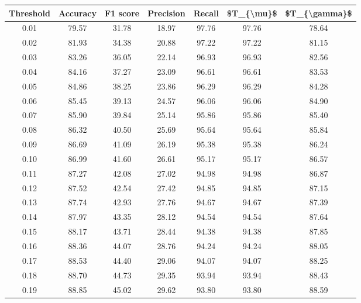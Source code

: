 \begin{tabular}{|c|c|c|c|c|c|c|}
\hline
 Threshold &  Accuracy &  F1 score &  Precision &  Recall &  \$T\_\{\textbackslash mu\}\$ &  \$T\_\{\textbackslash gamma\}\$ \\
\hline
      0.01 &     79.57 &     31.78 &      18.97 &   97.76 &      97.76 &         78.64 \\
      0.02 &     81.93 &     34.38 &      20.88 &   97.22 &      97.22 &         81.15 \\
      0.03 &     83.26 &     36.05 &      22.14 &   96.93 &      96.93 &         82.56 \\
      0.04 &     84.16 &     37.27 &      23.09 &   96.61 &      96.61 &         83.53 \\
      0.05 &     84.86 &     38.25 &      23.86 &   96.29 &      96.29 &         84.28 \\
      0.06 &     85.45 &     39.13 &      24.57 &   96.06 &      96.06 &         84.90 \\
      0.07 &     85.90 &     39.84 &      25.14 &   95.86 &      95.86 &         85.40 \\
      0.08 &     86.32 &     40.50 &      25.69 &   95.64 &      95.64 &         85.84 \\
      0.09 &     86.69 &     41.09 &      26.19 &   95.38 &      95.38 &         86.24 \\
      0.10 &     86.99 &     41.60 &      26.61 &   95.17 &      95.17 &         86.57 \\
      0.11 &     87.27 &     42.08 &      27.02 &   94.98 &      94.98 &         86.87 \\
      0.12 &     87.52 &     42.54 &      27.42 &   94.85 &      94.85 &         87.15 \\
      0.13 &     87.74 &     42.93 &      27.76 &   94.67 &      94.67 &         87.39 \\
      0.14 &     87.97 &     43.35 &      28.12 &   94.54 &      94.54 &         87.64 \\
      0.15 &     88.17 &     43.71 &      28.44 &   94.38 &      94.38 &         87.85 \\
      0.16 &     88.36 &     44.07 &      28.76 &   94.24 &      94.24 &         88.05 \\
      0.17 &     88.53 &     44.40 &      29.06 &   94.07 &      94.07 &         88.25 \\
      0.18 &     88.70 &     44.73 &      29.35 &   93.94 &      93.94 &         88.43 \\
      0.19 &     88.85 &     45.02 &      29.62 &   93.80 &      93.80 &         88.59 \\

\end{tabular}
